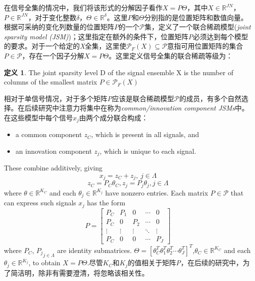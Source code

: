 \documentclass[UTF8]{ctexart}
\theoremstyle{plain}
\theoremstyle{definition}
\newtheorem{definition}{定义}[section]
\theoremstyle{remark}
\begin{document}
	在信号全集的情况中，我们将该形式的分解因子看作$X=P\Theta$，其中$X \in \mathbb{R}^{JN}$，$P \in \mathbb{R}^{JN}$，对于变化整数$\delta$，$\Theta \in \mathbb{R}^{\delta}$。这里$P$和$\Theta$分别指的是\textcolor[rgb]{1,0,0}{位置矩阵}和\textcolor[rgb]{1,0,0}{数值向量}。根据可采纳的变化列数量的位置矩阵$P$的一个$\mathcal{P}$集，定义了一个联合稀疏模型(\emph{\textcolor[rgb]{1,0,0}{joint sparsity model (JSM)}})；这里指定在额外的条件下，位置矩阵\emph{P}必须达到每个模型的要求。对于一个给定的\emph{X}全集，这里使$\mathcal{P}_F(X)\subseteq\mathcal{P}$意指可用位置矩阵的集合$P \in \mathcal{P}$，存在一个因子分解$X=P\Theta$。这里定义信号全集的\textcolor[rgb]{1,0,0}{联合稀疏等级}为：
	\begin{definition}
		The joint sparsity level D of the signal ensemble X is the number of columns of the smallest matrix $P \in \mathcal{P}_F(X)$
	\end{definition}
	相对于单信号情况，对于多个矩阵\emph{P}应该是联合稀疏模型$\mathcal{P}$的成员，有多个自然选择。在后续研究中注意力将集中在称为\emph{common/innovation component JSMs}中。在这些模型中每个信号$x_j$由两个成分联合构成：
	\begin{itemize}
		\item a common component $z_C$, which is present in all signals, and
		\item an innovation component $z_j$, which is unique to each signal.
	\end{itemize}	
	These combine additively, giving
	\begin{equation*}
	x_j=z_C+z_j, \ j\in\Lambda
	\end{equation*}
	\begin{equation*}
	z_C=P_C\theta_C,z_j=P_j\theta_j,j\in \Lambda
	\end{equation*}
	where $\theta \in \mathbb{R}^{K_C}$ and each $\theta_j \in \mathbb{R}^{K_j}$ have nonzero entries. Each matrix $P\in\mathcal{P}$ that can express such signals ${x_j}$ has the form
	\begin{equation}
	P=\left[\begin{array}{ccccc}
	P_{C} & P_{1} & 0 & \cdots & 0\\
	P_{C} & 0 & P_{2} & \cdots & 0\\
	\vdots & \vdots & \vdots & \ddots & \vdots\\
	P_{C} & 0 & 0 & \cdots & P_{J}
	\end{array}\right]
	\label{eq5}
	\end{equation}
	where $P_C$, ${P_j}_{j\in\Lambda}$ are identity submatrices. $\Theta=\left[\theta_C^T\theta_1^T\theta_2^T\cdots\theta_J^T\right]^T$,$\theta_C\in \mathbb{R}^{K_C}$ and each $\theta_j\in\mathbb{R}^{K_j}$, to obtain $X=P\Theta$.尽管$K_C$和$K_j$的值相关于矩阵\emph{P}，在后续的研究中，为了简洁明，除非有需要澄清，将忽略该相关性。
	
\end{document}
